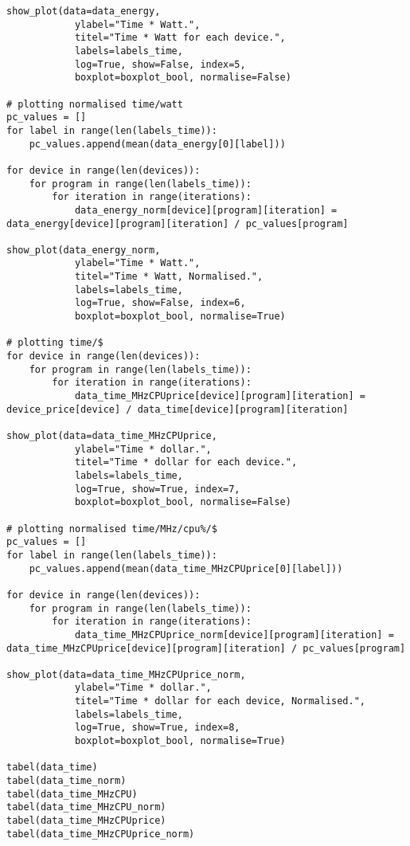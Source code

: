 \begin{lstlisting}
show_plot(data=data_energy,
			ylabel="Time * Watt.",
			titel="Time * Watt for each device.",
			labels=labels_time,
			log=True, show=False, index=5,
			boxplot=boxplot_bool, normalise=False)

# plotting normalised time/watt
pc_values = []
for label in range(len(labels_time)):
	pc_values.append(mean(data_energy[0][label]))

for device in range(len(devices)):
	for program in range(len(labels_time)):
		for iteration in range(iterations):
			data_energy_norm[device][program][iteration] = data_energy[device][program][iteration] / pc_values[program]
			
show_plot(data_energy_norm,
			ylabel="Time * Watt.",
			titel="Time * Watt, Normalised.",
			labels=labels_time,
			log=True, show=False, index=6,
			boxplot=boxplot_bool, normalise=True)

# plotting time/$
for device in range(len(devices)):
	for program in range(len(labels_time)):
		for iteration in range(iterations):
			data_time_MHzCPUprice[device][program][iteration] = device_price[device] / data_time[device][program][iteration]

show_plot(data=data_time_MHzCPUprice,
			ylabel="Time * dollar.",
			titel="Time * dollar for each device.",
			labels=labels_time,
			log=True, show=True, index=7,
			boxplot=boxplot_bool, normalise=False)

# plotting normalised time/MHz/cpu%/$
pc_values = []
for label in range(len(labels_time)):
	pc_values.append(mean(data_time_MHzCPUprice[0][label]))

for device in range(len(devices)):
	for program in range(len(labels_time)):
		for iteration in range(iterations):
			data_time_MHzCPUprice_norm[device][program][iteration] = data_time_MHzCPUprice[device][program][iteration] / pc_values[program]
			
show_plot(data=data_time_MHzCPUprice_norm,
			ylabel="Time * dollar.",
			titel="Time * dollar for each device, Normalised.",
			labels=labels_time,
			log=True, show=True, index=8,
			boxplot=boxplot_bool, normalise=True)

tabel(data_time)
tabel(data_time_norm)
tabel(data_time_MHzCPU)
tabel(data_time_MHzCPU_norm)
tabel(data_time_MHzCPUprice)
tabel(data_time_MHzCPUprice_norm)
\end{lstlisting}